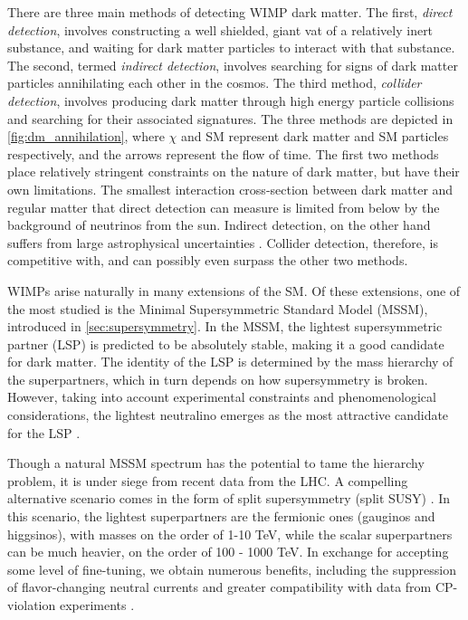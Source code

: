There are three main methods of detecting WIMP dark matter. The first, \emph{direct detection}, involves constructing a well shielded, giant vat of a relatively inert substance, and waiting for dark matter particles to interact with that substance. The second, termed \emph{indirect detection}, involves searching for signs of dark matter particles annihilating each other in the cosmos. The third method, \emph{collider detection}, involves producing dark matter through high energy particle collisions and searching for their associated signatures. The three methods are depicted in \autoref{fig:dm_annihilation}, where $\chi$ and SM represent dark matter and SM particles respectively, and the arrows represent the flow of time. The first two methods place relatively stringent constraints on the nature of dark matter, but have their own limitations. The smallest interaction cross-section between dark matter and regular matter that direct detection can measure is limited from below by the background of neutrinos from the sun. Indirect detection, on the other hand suffers from large astrophysical uncertainties \cite{Low:2014cba}. Collider detection, therefore, is competitive with, and can possibly even surpass the other two methods.

\newcommand{\cb}{ c_\beta}
\newcommand{\cw}{ c_W}
\newcommand{\sinb}{ s_\beta}
\newcommand{\sw}{ s_W}
\newcommand{\mz}{ m_Z}

WIMPs arise naturally in many extensions of the SM. Of these extensions, one of the most studied is the Minimal Supersymmetric Standard Model (MSSM), introduced in \autoref{sec:supersymmetry}. In the MSSM, the lightest supersymmetric partner (LSP) is predicted to be absolutely stable, making it a good candidate for dark matter. The identity of the LSP is determined by the mass hierarchy of the superpartners, which in turn depends on how supersymmetry is broken. However, taking into account experimental constraints and phenomenological considerations, the lightest neutralino emerges as the most attractive candidate for the LSP \citep{Bertone:2004pz}. 

Though a natural MSSM spectrum has the potential to tame the hierarchy problem, it is under siege from recent data from the LHC. A compelling alternative scenario comes in the form of split supersymmetry (split SUSY) \citep{Wells:2003tf, ArkaniHamed:2004yi, Giudice:2004tc}. In this scenario, the lightest superpartners are the fermionic ones (gauginos and higgsinos), with masses on the order of 1-10 TeV, while the scalar superpartners can be much heavier, on the order of 100 - 1000 TeV. In exchange for accepting some level of fine-tuning, we obtain numerous benefits, including the suppression of flavor-changing neutral currents and greater compatibility with data from CP-violation experiments \cite{Wells:2003tf}.

